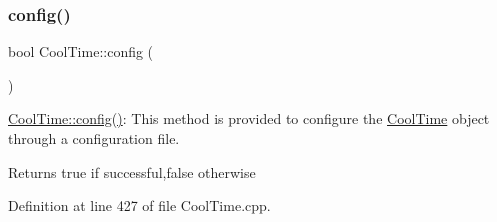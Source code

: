 \subsubsection{\texorpdfstring{config()}{config()}\hspace{0.1cm}{\footnotesize\ttfamily [1/2]}}
{\footnotesize\ttfamily bool Cool\+Time\+::config (\begin{DoxyParamCaption}{ }\end{DoxyParamCaption})}

\hyperlink{class_cool_time_a87c28260c1bc77091162cbcf1ee2e129}{Cool\+Time\+::config()}\+: This method is provided to configure the \hyperlink{class_cool_time}{Cool\+Time} object through a configuration file.

\begin{DoxyReturn}{Returns}
true if successful,false otherwise 
\end{DoxyReturn}


Definition at line 427 of file Cool\+Time.\+cpp.


